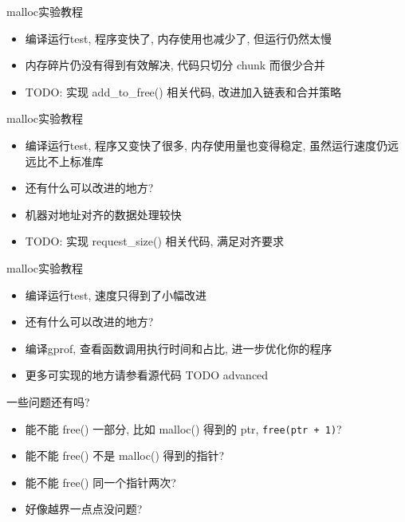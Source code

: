 \begin{frame}[fragile]{malloc实验教程}
    \begin{itemize}[<+- | alert@+>]
        \item 编译运行test, 程序变快了, 内存使用也减少了, 但运行仍然太慢
        \item 内存碎片仍没有得到有效解决, 代码只切分 chunk 而很少合并
        \item TODO: 实现 add\_to\_free() 相关代码, 改进加入链表和合并策略
    \end{itemize}
\end{frame}

\begin{frame}[fragile]{malloc实验教程}
    \begin{itemize}[<+- | alert@+>]
        \item 编译运行test, 程序又变快了很多, 内存使用量也变得稳定, 虽然运行速度仍远远比不上标准库
        \item 还有什么可以改进的地方?
        \item 机器对地址对齐的数据处理较快
        \item TODO: 实现 request\_size() 相关代码, 满足对齐要求
    \end{itemize}
\end{frame}

\begin{frame}[fragile]{malloc实验教程}
    \begin{itemize}[<+- | alert@+>]
        \item 编译运行test, 速度只得到了小幅改进
        \item 还有什么可以改进的地方?
        \item 编译gprof, 查看函数调用执行时间和占比, 进一步优化你的程序
        \item 更多可实现的地方请参看源代码 TODO advanced
    \end{itemize}
\end{frame}

\begin{frame}[fragile]{一些问题还有吗?}
    \begin{itemize}[<+- | alert@+>]
        \item 能不能 free() 一部分, 比如 malloc() 得到的 ptr, \texttt{free(ptr + 1)}?
        \item 能不能 free() 不是 malloc() 得到的指针?
        \item 能不能 free() 同一个指针两次?
        \item 好像越界一点点没问题?
    \end{itemize}
\end{frame}